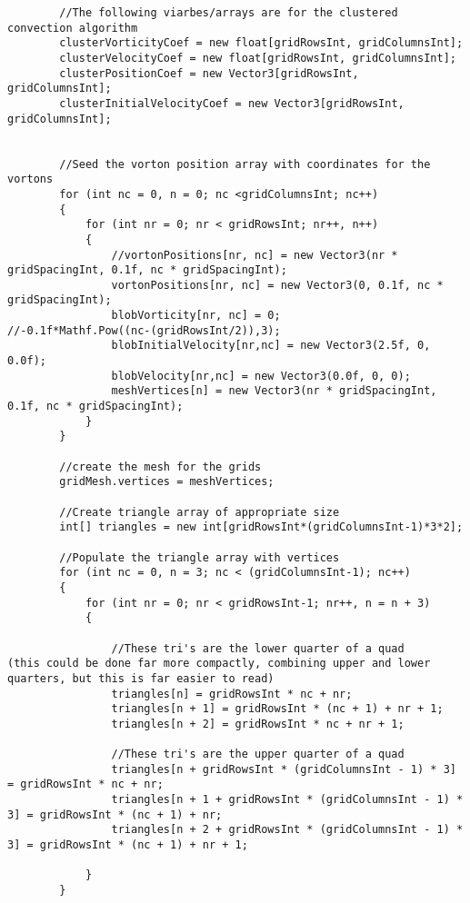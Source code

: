 \begin{mdframed}[linecolor=black, topline=true, bottomline=true,
  leftline=false, rightline=false]
\begin{verbatim}
        //The following viarbes/arrays are for the clustered convection algorithm
        clusterVorticityCoef = new float[gridRowsInt, gridColumnsInt];
        clusterVelocityCoef = new float[gridRowsInt, gridColumnsInt];
        clusterPositionCoef = new Vector3[gridRowsInt, gridColumnsInt];
        clusterInitialVelocityCoef = new Vector3[gridRowsInt, gridColumnsInt];


        //Seed the vorton position array with coordinates for the vortons
        for (int nc = 0, n = 0; nc <gridColumnsInt; nc++)
        {
            for (int nr = 0; nr < gridRowsInt; nr++, n++)
            {
                //vortonPositions[nr, nc] = new Vector3(nr * gridSpacingInt, 0.1f, nc * gridSpacingInt);
                vortonPositions[nr, nc] = new Vector3(0, 0.1f, nc * gridSpacingInt);
                blobVorticity[nr, nc] = 0;                                          //-0.1f*Mathf.Pow((nc-(gridRowsInt/2)),3);
                blobInitialVelocity[nr,nc] = new Vector3(2.5f, 0, 0.0f);
                blobVelocity[nr,nc] = new Vector3(0.0f, 0, 0);
                meshVertices[n] = new Vector3(nr * gridSpacingInt, 0.1f, nc * gridSpacingInt);
            }
        }

        //create the mesh for the grids
        gridMesh.vertices = meshVertices;

        //Create triangle array of appropriate size
        int[] triangles = new int[gridRowsInt*(gridColumnsInt-1)*3*2];

        //Populate the triangle array with vertices
        for (int nc = 0, n = 3; nc < (gridColumnsInt-1); nc++)
        {
            for (int nr = 0; nr < gridRowsInt-1; nr++, n = n + 3)
            {

                //These tri's are the lower quarter of a quad           (this could be done far more compactly, combining upper and lower quarters, but this is far easier to read)
                triangles[n] = gridRowsInt * nc + nr;
                triangles[n + 1] = gridRowsInt * (nc + 1) + nr + 1;
                triangles[n + 2] = gridRowsInt * nc + nr + 1;

                //These tri's are the upper quarter of a quad
                triangles[n + gridRowsInt * (gridColumnsInt - 1) * 3] = gridRowsInt * nc + nr;
                triangles[n + 1 + gridRowsInt * (gridColumnsInt - 1) * 3] = gridRowsInt * (nc + 1) + nr;
                triangles[n + 2 + gridRowsInt * (gridColumnsInt - 1) * 3] = gridRowsInt * (nc + 1) + nr + 1;

            }
        }


\end{verbatim}
\end{mdframed}
